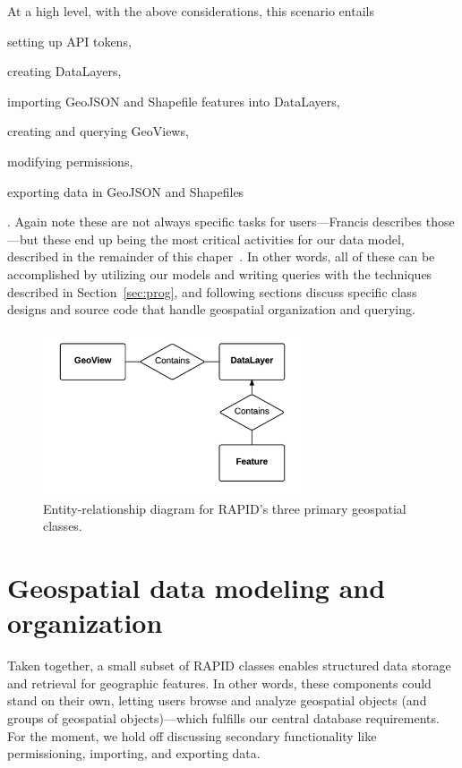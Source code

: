 At a high level, with the above considerations, this scenario entails
\begin{enumerate*}[label=\itshape\alph*\upshape)]
\item setting up API tokens,
\item creating DataLayers,
\item importing GeoJSON and Shapefile features into DataLayers,
\item creating and querying GeoViews,
\item modifying permissions,
\item exporting data in GeoJSON and Shapefiles
\end{enumerate*}. Again note these are not always specific tasks for users---Francis describes those---but these end up being the most critical activities for our data model, described in the remainder of this chaper~\cite{Francis}. In other words, all of these can be accomplished by utilizing our models and writing queries with the techniques described in Section~\ref{sec:prog}, and following sections discuss specific class designs and source code that handle geospatial organization and querying. 

\begin{figure}[ht]
    \centering
    \includegraphics[width=0.68\textwidth]{figures/3er.png}
    \caption{Entity-relationship diagram for RAPID's three primary geospatial classes.}
    \label{fig:3er}
\end{figure}

\section{Geospatial data modeling and organization}
Taken together, a small subset of RAPID classes enables structured data storage and retrieval for geographic features. In other words, these components could stand on their own, letting users browse and analyze geospatial objects (and groups of geospatial objects)---which fulfills our central database requirements. For the moment, we hold off discussing secondary functionality like permissioning, importing, and exporting data.

